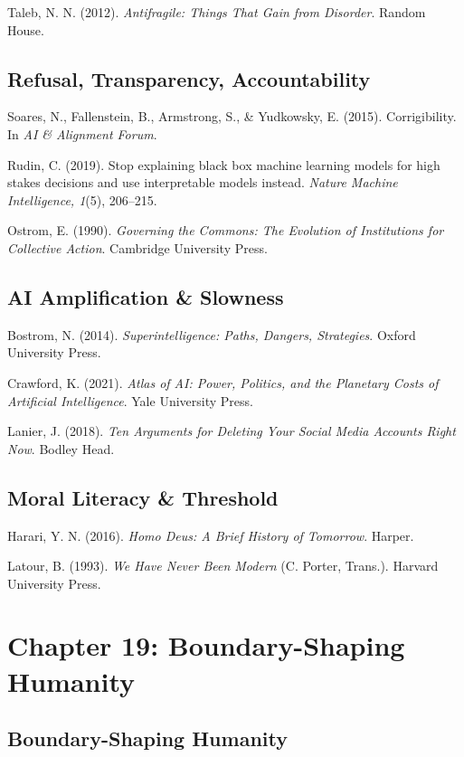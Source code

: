 \documentclass[
  openright]{book}
\begin{document}
Taleb, N. N. (2012). \emph{Antifragile: Things That Gain from Disorder}.
Random House.

\subsection{Refusal, Transparency,
Accountability}\label{refusal-transparency-accountability}

Soares, N., Fallenstein, B., Armstrong, S., \& Yudkowsky, E. (2015).
Corrigibility. In \emph{AI \& Alignment Forum}.

Rudin, C. (2019). Stop explaining black box machine learning models for
high stakes decisions and use interpretable models instead. \emph{Nature
Machine Intelligence, 1}(5), 206--215.

Ostrom, E. (1990). \emph{Governing the Commons: The Evolution of
Institutions for Collective Action}. Cambridge University Press.

\subsection{AI Amplification \&
Slowness}\label{ai-amplification-slowness}

Bostrom, N. (2014). \emph{Superintelligence: Paths, Dangers,
Strategies}. Oxford University Press.

Crawford, K. (2021). \emph{Atlas of AI: Power, Politics, and the
Planetary Costs of Artificial Intelligence}. Yale University Press.

Lanier, J. (2018). \emph{Ten Arguments for Deleting Your Social Media
Accounts Right Now}. Bodley Head.

\subsection{Moral Literacy \& Threshold}\label{moral-literacy-threshold}

Harari, Y. N. (2016). \emph{Homo Deus: A Brief History of Tomorrow}.
Harper.

Latour, B. (1993). \emph{We Have Never Been Modern} (C. Porter, Trans.).
Harvard University Press.

\section{Chapter 19: Boundary-Shaping
Humanity}\label{chapter-19-boundary-shaping-humanity}

\subsection{Boundary-Shaping Humanity}\label{boundary-shaping-humanity}
\end{document}
